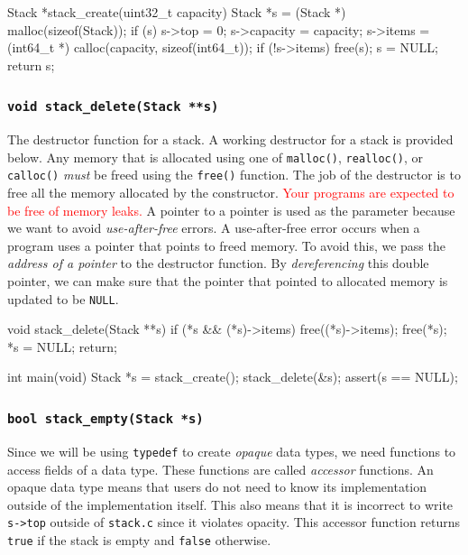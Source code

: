 \documentclass[11pt]{article}
\begin{document}
\begin{codelisting}{}
Stack *stack_create(uint32_t capacity) {
  Stack *s = (Stack *) malloc(sizeof(Stack));
  if (s) {
    s->top = 0;
    s->capacity = capacity;
    s->items = (int64_t *) calloc(capacity, sizeof(int64_t));
    if (!s->items) {
      free(s);
      s = NULL;
    }
  }
  return s;
}
\end{codelisting}

\subsubsection{\texttt{void stack\_delete(Stack **s)}}

The destructor function for a stack. A working destructor for a stack is
provided below. Any memory that is allocated using one of
\texttt{malloc()}, \texttt{realloc()}, or \texttt{calloc()} \emph{must}
be freed using the \texttt{free()} function. The job of the destructor
is to free all the memory allocated by the constructor.
\textcolor{red}{Your programs are expected to be free of memory leaks.}
A pointer to a pointer is used as the parameter because we want to avoid
\emph{use-after-free} errors. A use-after-free error occurs when a
program uses a pointer that points to freed memory. To avoid this, we
pass the \emph{address of a pointer} to the destructor function. By
\emph{dereferencing} this double pointer, we can make sure that the
pointer that pointed to allocated memory is updated to be \texttt{NULL}.

\begin{codelisting}{}
void stack_delete(Stack **s) {
  if (*s && (*s)->items) {
    free((*s)->items);
    free(*s);
    *s = NULL;
  }
  return;
}

int main(void) {
  Stack *s = stack_create();
  stack_delete(&s);
  assert(s == NULL);
}
\end{codelisting}


\subsubsection{\texttt{bool stack\_empty(Stack *s)}}

Since we will be using \texttt{typedef} to create \emph{opaque} data
types, we need functions to access fields of a data type. These
functions are called \emph{accessor} functions. An opaque data type
means that users do not need to know its implementation outside of the
implementation itself. This also means that it is incorrect to write
\texttt{s->top} outside of \texttt{stack.c} since it violates opacity.
This accessor function returns \texttt{true} if the stack is empty and
\texttt{false} otherwise.
\end{document}
